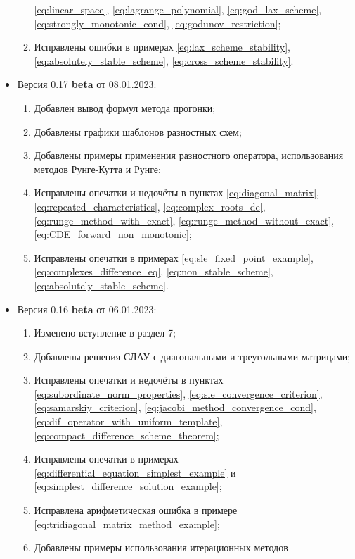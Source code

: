 \documentclass{article}
\begin{document}
\begin{itemize}[nosep]
\begin{enumerate}[nosep]
			\eqref{eq:linear_space},
			\eqref{eq:lagrange_polynomial}, 
			\eqref{eq:god_lax_scheme},
			\eqref{eq:strongly_monotonic_cond},
			\eqref{eq:godunov_restriction};
		\item Исправлены ошибки в примерах
			\eqref{eq:lax_scheme_stability},
			\eqref{eq:absolutely_stable_scheme},
			\eqref{eq:cross_scheme_stability}.
	\end{enumerate}
\item Версия 0.17 \textbf{beta} от 08.01.2023:
	\begin{enumerate}[nosep]
		\item Добавлен вывод формул метода прогонки;
		\item Добавлены графики шаблонов разностных схем;
		\item Добавлены примеры применения разностного оператора,
			использования методов Рунге-Кутта и Рунге;
		\item Исправлены опечатки и недочёты в пунктах
			\eqref{eq:diagonal_matrix},
			\eqref{eq:repeated_characteristics},
			\eqref{eq:complex_roots_de},
			\eqref{eq:runge_method_with_exact},
			\eqref{eq:runge_method_without_exact},
			\eqref{eq:CDE_forward_non_monotonic};
		\item Исправлены опечатки в примерах
			\eqref{eq:sle_fixed_point_example},
			\eqref{eq:complexes_difference_eq},
			\eqref{eq:non_stable_scheme},
			\eqref{eq:absolutely_stable_scheme}.
	\end{enumerate}
\item Версия 0.16 \textbf{beta} от 06.01.2023:
	\begin{enumerate}[nosep]
		\item Изменено вступление в раздел 7;
		\item Добавлены решения СЛАУ с диагональными и треугольными
			матрицами;
		\item Исправлены опечатки и недочёты в пунктах
			\eqref{eq:subordinate_norm_properties},
			\eqref{eq:sle_convergence_criterion},
			\eqref{eq:samarskiy_criterion},
			\eqref{eq:jacobi_method_convergence_cond},
			\eqref{eq:dif_operator_with_uniform_template},
			\eqref{eq:compact_difference_scheme_theorem};
		\item Исправлены опечатки в примерах
			\eqref{eq:differential_equation_simplest_example} и
			\eqref{eq:simplest_difference_solution_example};
		\item Исправлена арифметическая ошибка в примере
			\eqref{eq:tridiagonal_matrix_method_example};
		\item Добавлены примеры использования итерационных методов

\end{enumerate}
\end{itemize}
\end{document}
